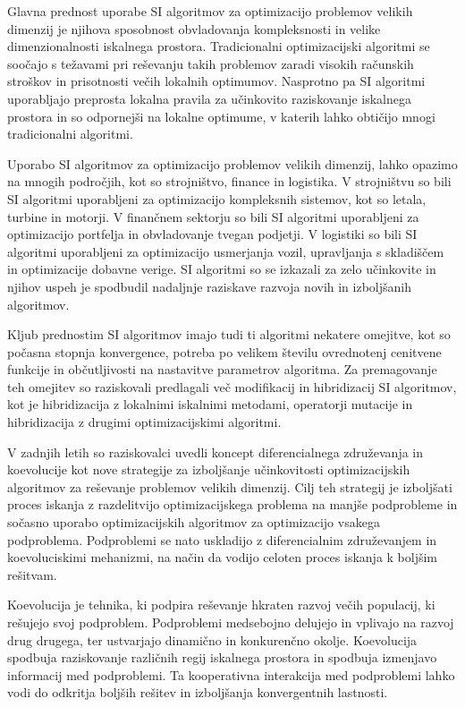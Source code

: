 Glavna prednost uporabe SI algoritmov za optimizacijo problemov velikih dimenzij je njihova sposobnost obvladovanja kompleksnosti in velike dimenzionalnosti iskalnega prostora.
Tradicionalni optimizacijski algoritmi se soočajo s težavami pri reševanju takih problemov zaradi visokih računskih stroškov in prisotnosti večih lokalnih optimumov.
Nasprotno pa SI algoritmi uporabljajo preprosta lokalna pravila za učinkovito raziskovanje iskalnega prostora in so odpornejši na lokalne optimume, v katerih lahko obtičijo mnogi tradicionalni algoritmi.

Uporabo SI algoritmov za optimizacijo problemov velikih dimenzij, lahko opazimo na mnogih področjih, kot so strojništvo, finance in logistika.
V strojništvu so bili SI algoritmi uporabljeni za optimizacijo kompleksnih sistemov, kot so letala, turbine in motorji.
V finančnem sektorju so bili SI algoritmi uporabljeni za optimizacijo portfelja in obvladovanje tvegan podjetji.
V logistiki so bili SI algoritmi uporabljeni za optimizacijo usmerjanja vozil, upravljanja s skladiščem in optimizacije dobavne verige.
SI algoritmi so se izkazali za zelo učinkovite in njihov uspeh je spodbudil nadaljnje raziskave razvoja novih in izboljšanih algoritmov.

Kljub prednostim SI algoritmov imajo tudi ti algoritmi nekatere omejitve, kot so počasna stopnja konvergence, potreba po velikem številu ovrednotenj cenitvene funkcije in občutljivosti na nastavitve parametrov algoritma.
Za premagovanje teh omejitev so raziskovali predlagali več modifikacij in hibridizacij SI algoritmov, kot je hibridizacija z lokalnimi iskalnimi metodami, operatorji mutacije in hibridizacija z drugimi optimizacijskimi algoritmi.

V zadnjih letih so raziskovalci uvedli koncept diferencialnega združevanja in koevolucije kot nove strategije za izboljšanje učinkovitosti optimizacijskih algoritmov za reševanje problemov velikih dimenzij.
Cilj teh strategij je izboljšati proces iskanja z razdelitvijo optimizacijskega problema na manjše podprobleme in sočasno uporabo optimizacijskih algoritmov za optimizacijo vsakega podproblema.
Podproblemi se nato uskladijo z diferencialnim združevanjem in koevoluciskimi mehanizmi, na način da vodijo celoten proces iskanja k boljšim rešitvam.

Koevolucija je tehnika, ki podpira reševanje hkraten razvoj večih populacij, ki rešujejo svoj podproblem.
Podproblemi medsebojno delujejo in vplivajo na razvoj drug drugega, ter ustvarjajo dinamično in konkurenčno okolje.
Koevolucija spodbuja raziskovanje različnih regij iskalnega prostora in spodbuja izmenjavo informacij med podproblemi.
Ta kooperativna interakcija med podproblemi lahko vodi do odkritja boljših rešitev in izboljšanja konvergentnih lastnosti.

